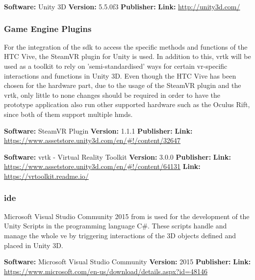 \textbf{Software:} Unity 3D \newline
\textbf{Version:} 5.5.0f3 \newline
\textbf{Publisher:} \cite{Unity2016} \newline
\textbf{Link:} \url{http://unity3d.com/}


\subsubsection{Game Engine Plugins}
For the integration of the \gls{sdk} to access the specific methods and functions of the HTC Vive, the SteamVR plugin for Unity is used. In addition to this, \gls{vrtk} will be used as a toolkit to rely on 'semi-standardised' ways for certain \gls{vr}-specific interactions and functions in Unity 3D. Even though the HTC Vive has been chosen for the hardware part, due to the usage of the SteamVR plugin and the \gls{vrtk}, only little to none changes should be required in order to have the prototype application also run other supported hardware such as the Oculus Rift, since both of them support multiple \glspl{hmd}.

\textbf{Software:} SteamVR Plugin \newline
\textbf{Version:} 1.1.1 \newline
\textbf{Publisher:} \cite{Valve2016a} \newline
\textbf{Link:} \url{https://www.assetstore.unity3d.com/en/#!/content/32647}

\textbf{Software:} \gls{vrtk} - Virtual Reality Toolkit \newline
\textbf{Version:} 3.0.0 \newline
\textbf{Publisher:} \cite{Sysdia2017} \newline
\textbf{Link:} \url{https://www.assetstore.unity3d.com/en/#!/content/64131} \newline
\textbf{Link:} \url{https://vrtoolkit.readme.io/}


\subsubsection{\gls{ide}}
Microsoft Visual Studio Community 2015 from  is used for the development of the Unity Scripts in the programming language C\#. These scripts handle and manage the whole \gls{ve} by triggering interactions of the 3D objects defined and placed in Unity 3D.

\textbf{Software:} Microsoft Visual Studio Community \newline
\textbf{Version:} 2015 \newline
\textbf{Publisher:} \cite{Microsoft2015} \newline
\textbf{Link:} \url{https://www.microsoft.com/en-us/download/details.aspx?id=48146}
 

